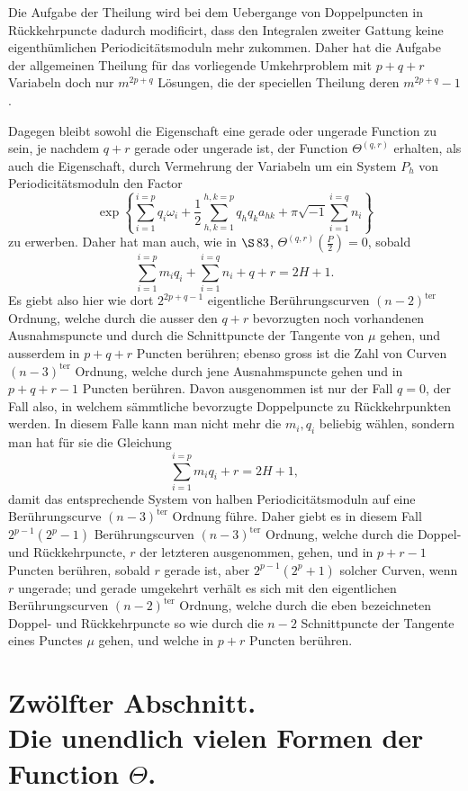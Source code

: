 \documentclass[10pt]{article}
\begin{document}
Die Aufgabe der Theilung wird bei dem Uebergange von Doppelpuncten in Rückkehrpuncte dadurch modificirt, dass den Integralen zweiter Gattung keine eigenthümlichen Periodicitätsmoduln mehr zukommen. Daher hat die Aufgabe der allgemeinen Theilung für das vorliegende Umkehrproblem mit \(p+q+r\) Variabeln doch nur \(m^{2p+q}\) Lösungen, die der speciellen Theilung deren \(m^{2p+q}-1\).

Dagegen bleibt sowohl die Eigenschaft eine gerade oder ungerade Function zu sein, je nachdem \(q+r\) gerade oder ungerade ist, der Function \(\Theta^{(q,r)}\) erhalten, als auch die Eigenschaft, durch Vermehrung der Variabeln um ein System \(P_h\) von Periodicitätsmoduln den Factor
\[
\exp\!\left\{\sum_{i=1}^{i=p}q_i\omega_i
+\frac12\sum_{h,k=1}^{h,k=p}q_hq_ka_{hk}
+\pi\sqrt{-1}\sum_{i=1}^{i=q}n_i\right\}
\]
zu erwerben. Daher hat man auch, wie in \(\S\,83\), \(\Theta^{(q,r)}\left(\frac P2\right)=0\), sobald
\[
\sum_{i=1}^{i=p}m_iq_i+\sum_{i=1}^{i=q}n_i+q+r=2H+1.
\]
Es giebt also hier wie dort \(2^{2p+q-1}\) eigentliche Berührungscurven \((n-2)^{\mathrm{ter}}\) Ordnung, welche durch die ausser den \(q+r\) bevorzugten noch vorhandenen Ausnahmspuncte und durch die Schnittpuncte der Tangente von \(\mu\) gehen, und ausserdem in \(p+q+r\) Puncten berühren; ebenso gross ist die Zahl von Curven \((n-3)^{\mathrm{ter}}\) Ordnung, welche durch jene Ausnahmspuncte gehen und in \(p+q+r-1\) Puncten berühren. Davon ausgenommen ist nur der Fall \(q=0\), der Fall also, in welchem sämmtliche bevorzugte Doppelpuncte zu Rückkehrpunkten werden. In diesem Falle kann man nicht mehr die \(m_i,q_i\) beliebig wählen, sondern man hat für sie die Gleichung
\[
\sum_{i=1}^{i=p}m_iq_i+r=2H+1,
\]
damit das entsprechende System von halben Periodicitätsmoduln auf eine Berührungscurve \((n-3)^{\mathrm{ter}}\) Ordnung führe. Daher giebt es in diesem Fall \(2^{p-1}(2^p-1)\) Berührungscurven \((n-3)^{\mathrm{ter}}\) Ordnung, welche durch die Doppel- und Rückkehrpuncte, \(r\) der letzteren ausgenommen, gehen, und in \(p+r-1\) Puncten berühren, sobald \(r\) gerade ist, aber \(2^{p-1}(2^p+1)\) solcher Curven, wenn \(r\) ungerade; und gerade umgekehrt verhält es sich mit den eigentlichen Berührungscurven \((n-2)^{\mathrm{ter}}\) Ordnung, welche durch die eben bezeichneten Doppel- und Rückkehrpuncte so wie durch die \(n-2\) Schnittpuncte der Tangente eines Punctes \(\mu\) gehen, und welche in \(p+r\) Puncten berühren.



\section*{Zwölfter Abschnitt.\\Die unendlich vielen Formen der Function \(\Theta\).}
\end{document}
